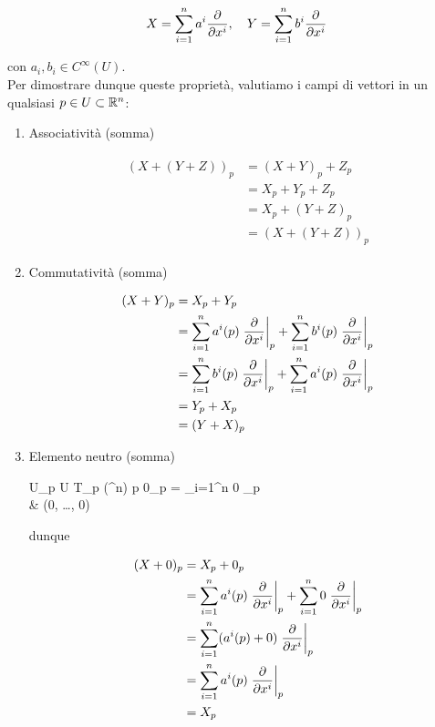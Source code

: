 {\begin{equation}
	X = \sum_{i=1}^{n} a^{i} \pdv{x^{i}} \qcomma Y = \sum_{i=1}^{n} b^{i} \pdv{x^{i}}
\end{equation}

con $ a_{i}, b_{i} \in C^{\infty}(U) $. \\
Per dimostrare dunque queste proprietà, valutiamo i campi di vettori in un qualsiasi $ p \in U \subset \mathbb{R}^{n} $:

\begin{enumerate}
	\item Associatività (somma)
	
	\begin{align}
		\begin{split}
			(X + (Y + Z))_{p} &= (X + Y)_{p} + Z_{p} \\
			&= X_{p} + Y_{p} + Z_{p} \\
			&= X_{p} + (Y + Z)_{p} \\
			&= (X + (Y + Z))_{p}
		\end{split}
	\end{align}
	
	\item Commutatività (somma)
	
	\begin{align}
		\begin{split}
			(X + Y)_{p} &= X_{p} + Y_{p} \\
			&= \sum_{i=1}^{n} a^{i} (p) \eval{ \pdv{x^{i}} }_{p} + \sum_{i=1}^{n} b^{i} (p) \eval{ \pdv{x^{i}} }_{p} \\
			&= \sum_{i=1}^{n} b^{i} (p) \eval{ \pdv{x^{i}} }_{p} + \sum_{i=1}^{n} a^{i} (p) \eval{ \pdv{x^{i}} }_{p} \\
			&= Y_{p} + X_{p} \\
			&= (Y + X)_{p}
		\end{split}
	\end{align}
	
	\item Elemento neutro (somma)
	
		{U}{\bigsqcup_{p \in U} T_{p} (\R^{n})}
		{p}{%
			0_{p} = \sum_{i=1}^{n} 0 _{p} \\
			& (0, \dots, 0)%
			}
	
	dunque
	
	\begin{align}
		\begin{split}
			(X + 0)_{p} &= X_{p} + 0_{p} \\
			&= \sum_{i=1}^{n} a^{i} (p) \eval{ \pdv{x^{i}} }_{p} + \sum_{i=1}^{n} 0 \eval{ \pdv{x^{i}} }_{p} \\
			&= \sum_{i=1}^{n} (a^{i} (p) + 0) \eval{ \pdv{x^{i}} }_{p} \\
			&= \sum_{i=1}^{n} a^{i} (p) \eval{ \pdv{x^{i}} }_{p} \\
			&= X_{p}
		\end{split}
	\end{align}
	

\end{enumerate}}
